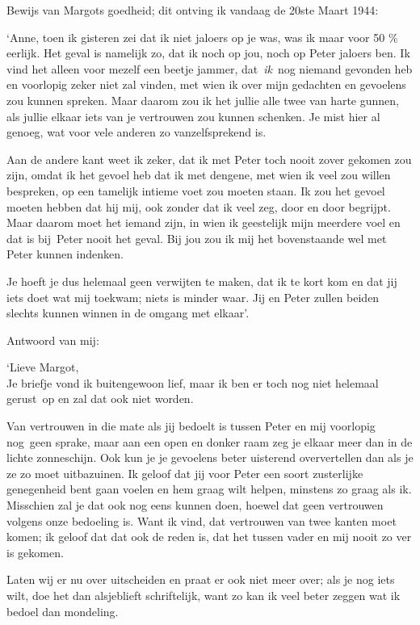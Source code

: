\documentclass{book}
\begin{document}
Bewijs van Margots goedheid; dit ontving ik vandaag de 20ste Maart 1944:

`Anne, toen ik gisteren zei dat ik niet jaloers op je was, was ik maar voor 50
\% eerlijk. Het geval is namelijk zo, dat ik noch op jou, noch op Peter jaloers
ben. Ik vind het alleen voor mezelf een beetje jammer, dat~\emph{ik}~nog niemand
gevonden heb en voorlopig zeker niet zal vinden, met wien ik over mijn gedachten
en gevoelens zou kunnen spreken.  Maar daarom zou ik het jullie alle twee van
harte gunnen, als jullie elkaar iets van je vertrouwen zou kunnen schenken. Je
mist hier al genoeg, wat voor vele anderen zo vanzelfsprekend is.

Aan de andere kant weet ik zeker, dat ik met Peter toch nooit zover gekomen zou
zijn, omdat ik het gevoel heb dat ik met dengene, met wien ik veel zou willen
bespreken, op een tamelijk intieme voet zou moeten staan. Ik zou het gevoel
moeten hebben dat hij mij, ook zonder dat ik veel zeg, door en door begrijpt.
Maar daarom moet het iemand zijn, in wien ik geestelijk mijn meerdere voel en
dat is bij~Peter nooit het geval. Bij jou zou ik mij het bovenstaande wel met
Peter kunnen indenken.

Je hoeft je dus helemaal geen verwijten te maken, dat ik te kort kom en dat jij
iets doet wat mij toekwam; niets is minder waar. Jij en Peter zullen beiden
slechts kunnen winnen in de omgang met elkaar'.

Antwoord van mij:

`Lieve Margot,\\
Je briefje vond ik buitengewoon lief, maar ik ben er toch nog
niet helemaal gerust~op en zal dat ook niet worden.

Van vertrouwen in die mate als jij bedoelt is tussen Peter en mij voorlopig
nog~geen sprake, maar aan een open en donker raam zeg je elkaar meer dan in de
lichte zonneschijn. Ook kun je je gevoelens beter uisterend oververtellen dan
als je ze zo moet uitbazuinen. Ik geloof dat jij voor Peter een soort
zusterlijke genegenheid bent gaan voelen en hem graag wilt helpen, minstens zo
graag als ik. Misschien zal je dat ook nog eens kunnen doen, hoewel dat geen
vertrouwen volgens onze bedoeling is. Want ik vind, dat vertrouwen van twee
kanten moet komen; ik geloof dat dat ook de reden is, dat het tussen vader en
mij nooit zo ver is gekomen.

Laten wij er nu over uitscheiden en praat er ook niet meer over; als je nog iets
wilt, doe het dan alsjeblieft schriftelijk, want zo kan ik veel beter zeggen wat
ik bedoel dan mondeling.
\end{document}
